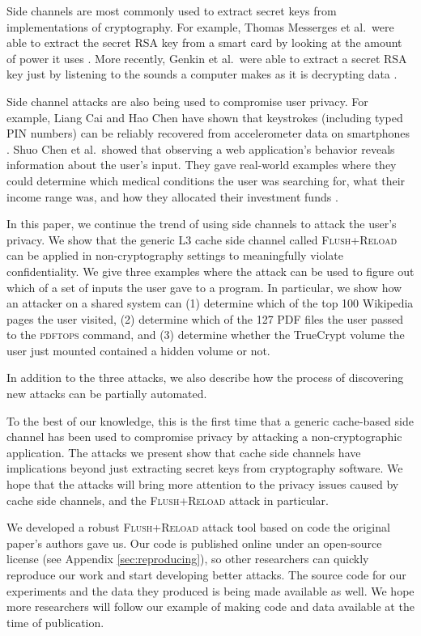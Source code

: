 \documentclass[letterpaper,twocolumn,10pt]{article}
\begin{document}
Side channels are most commonly used to extract secret keys from implementations
of cryptography. For example, Thomas Messerges et al.\ were able to extract the
secret RSA key from a smart card by looking at the amount of power it uses
\cite{messerges1999power}. More recently, Genkin et al.\ were able to extract
a secret RSA key just by listening to the sounds a computer makes as it is
decrypting data \cite{genkin2013rsa}. 

Side channel attacks are also being used to compromise user privacy. For
example, Liang Cai and Hao Chen have shown that keystrokes (including typed PIN
numbers) can be reliably recovered from accelerometer data on smartphones
\cite{cai2012practicality}. Shuo Chen et al.\ showed that observing a web
application's behavior reveals information about the user's input. They gave
real-world examples where they could determine which medical conditions the user
was searching for, what their income range was, and how they allocated their
investment funds \cite{chen2010side}.

In this paper, we continue the trend of using side channels to attack the user's
privacy. We show that the generic L3 cache side channel called
\textsc{Flush+Reload} \cite{yarom2013flush} can be applied in non-cryptography
settings to meaningfully violate confidentiality. We give three examples where
the attack can be used to figure out which of a set of inputs the user gave to
a program. In particular, we show how an attacker on a shared system can (1)
determine which of the top 100 Wikipedia pages the user visited, (2) determine
which of the 127 PDF files the user passed to the \textsc{pdftops} command, and
(3) determine whether the TrueCrypt volume the user just mounted contained
a hidden volume or not.

In addition to the three attacks, we also describe how the process of
discovering new attacks can be partially automated.

To the best of our knowledge, this is the first time that a generic cache-based
side channel has been used to compromise privacy by attacking
a non-cryptographic application. The attacks we present show that cache side
channels have implications beyond just extracting secret keys from cryptography
software. We hope that the attacks will bring more attention to the privacy
issues caused by cache side channels, and the \textsc{Flush+Reload} attack in
particular.

We developed a robust \textsc{Flush+Reload} attack tool based on code the
original paper's authors gave us. Our code is published online under an
open-source license (see Appendix \ref{sec:reproducing}), so other researchers
can quickly reproduce our work and start developing better attacks. The source
code for our experiments and the data they produced is being made available as
well. We hope more researchers will follow our example of making code and data
available at the time of publication.
\end{document}

